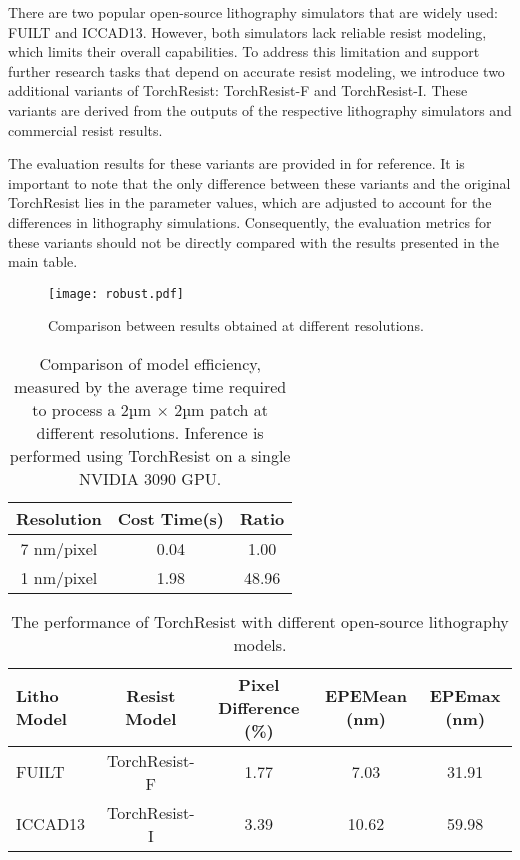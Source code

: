  There are two popular open-source lithography simulators that are widely used: FUILT\cite{fuilt} and ICCAD13\cite{banerjee2013iccad}. However, both simulators lack reliable resist modeling, which limits their overall capabilities. To address this limitation and support further research tasks that depend on accurate resist modeling, we introduce two additional variants of TorchResist: TorchResist-F and TorchResist-I. These variants are derived from the outputs of the respective lithography simulators and commercial resist results. 

The evaluation results for these variants are provided in  for reference. It is important to note that the only difference between these variants and the original TorchResist lies in the parameter values, which are adjusted to account for the differences in lithography simulations. Consequently, the evaluation metrics for these variants should not be directly compared with the results presented in the main table.





\begin{figure}[t]
    \centering
    \texttt{[image: robust.pdf]}
    \caption{Comparison between results obtained at different resolutions.}
    \label{fig:robust}
\end{figure}








\begin{table}[t!]
    \centering
    \caption{Comparison of model efficiency, measured by the average time required to process a 2µm $\times$ 2µm patch at different resolutions. Inference is performed using TorchResist on a single NVIDIA 3090 GPU.}
    \label{tab:time}
    \begin{tabular}{c|cc}
    \toprule
        Resolution & Cost Time(s) & Ratio\\
        \midrule
        7 nm/pixel&  0.04  &1.00 \\
         1 nm/pixel&  1.98  &48.96 \\
         \bottomrule
    \end{tabular}
\end{table}

\begin{table}[t!]
    \centering
    \caption{The performance of TorchResist with different open-source lithography models.}
    \label{tab:other}
  
    \begin{tabular}{@{}lcccc@{}}
        \toprule
         Litho Model&Resist Model & Pixel Difference (\%) & EPEMean (nm) & EPEmax (nm) \\ 
        \midrule
         FUILT\cite{fuilt} & TorchResist-F & 1.77&7.03 & 31.91 \\
         ICCAD13\cite{banerjee2013iccad} & TorchResist-I & 3.39 & 10.62 & 59.98\\
        \bottomrule
    \end{tabular}
    
\end{table}